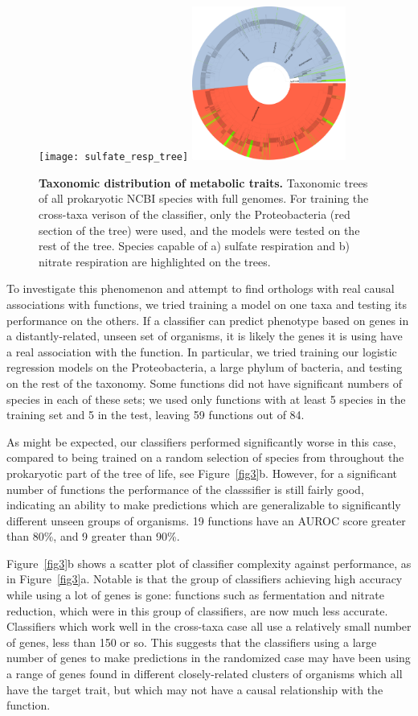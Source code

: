\documentclass[10pt,letterpaper]{article}
\begin{document}
\begin{figure}
\texttt{[image: sulfate\_resp\_tree]}
\includegraphics[width=0.45\textwidth]{nitrate_resp_tree}
\caption{{\bf Taxonomic distribution of metabolic traits.}
Taxonomic trees of all prokaryotic NCBI species with full genomes. For training the cross-taxa verison of the classifier, only the Proteobacteria (red section of the tree) were used, and the models were tested on the rest of the tree. Species capable of a) sulfate respiration and b) nitrate respiration are highlighted on the trees.}
\label{fig4}
\end{figure}

To investigate this phenomenon and attempt to find orthologs with real causal associations with functions, we tried training a model on one taxa and testing its performance on the others. If a classifier can predict phenotype based on genes in a distantly-related, unseen set of organisms, it is likely the genes it is using have a real association with the function. In particular, we tried training our logistic regression models on the Proteobacteria, a large phylum of bacteria, and testing on the rest of the taxonomy. Some functions did not have significant numbers of species in each of these sets; we used only functions with at least 5 species in the training set and 5 in the test, leaving 59 functions out of 84. 

As might be expected, our classifiers performed significantly worse in this case, compared to being trained on a random selection of species from throughout the prokaryotic part of the tree of life, see Figure~\ref{fig3}b. However, for a significant number of functions the performance of the classsifier is still fairly good, indicating an ability to make predictions which are generalizable to significantly different unseen groups of organisms. 19 functions have an AUROC score greater than 80\%, and 9 greater than 90\%. 

Figure~\ref{fig3}b shows a scatter plot of classifier complexity against performance, as in Figure~\ref{fig3}a. Notable is that the group of classifiers achieving high accuracy while using a lot of genes is gone: functions such as fermentation and nitrate reduction, which were in this group of classifiers, are now much less accurate. Classifiers which work well in the cross-taxa case all use a relatively small number of genes, less than 150 or so. This suggests that the classifiers using a large number of genes to make predictions in the randomized case may have been using a range of genes found in different closely-related clusters of organisms which all have the target trait, but which may not have a causal relationship with the function.
\end{document}
